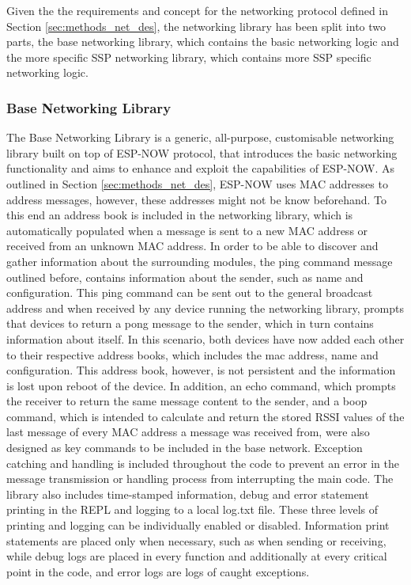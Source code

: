 Given the the requirements and concept for the networking protocol defined in Section \ref{sec:methods_net_des}, the networking library has been split into two parts, the base networking library, which contains the basic networking logic and the more specific SSP networking library, which contains more SSP specific networking logic.

\subsubsection{\label{sec:methods_networking}Base Networking Library}


The Base Networking Library is a generic, all-purpose, customisable networking library built on top of ESP-NOW protocol, that introduces the basic networking functionality and aims to enhance and exploit the capabilities of ESP-NOW. As outlined in Section \ref{sec:methods_net_des}, ESP-NOW uses MAC addresses to address messages, however, these addresses might not be know beforehand. To this end an address book is included in the networking library, which is automatically populated when a message is sent to a new MAC address or received from an unknown MAC address. In order to be able to discover and gather information about the surrounding modules, the ping command message outlined before, contains information about the sender, such as name and configuration. This ping command can be sent out to the general broadcast address and when received by any device running the networking library, prompts that devices to return a pong message to the sender, which in turn contains information about itself. In this scenario, both devices have now added each other to their respective address books, which includes the mac address, name and configuration. This address book, however, is not persistent and the information is lost upon reboot of the device. In addition, an echo command, which prompts the receiver to return the same message content to the sender, and a boop command, which is intended to calculate and return the stored RSSI values of the last message of every MAC address a message was received from, were also designed as key commands to be included in the base network. Exception catching and handling is included throughout the code to prevent an error in the message transmission or handling process from interrupting the main code. The library also includes time-stamped information, debug and error statement printing in the REPL and logging to a local log.txt file. These three levels of printing and logging can be individually enabled or disabled. Information print statements are placed only when necessary, such as when sending or receiving, while debug logs are placed in every function and additionally at every critical point in the code, and error logs are logs of caught exceptions.\\

